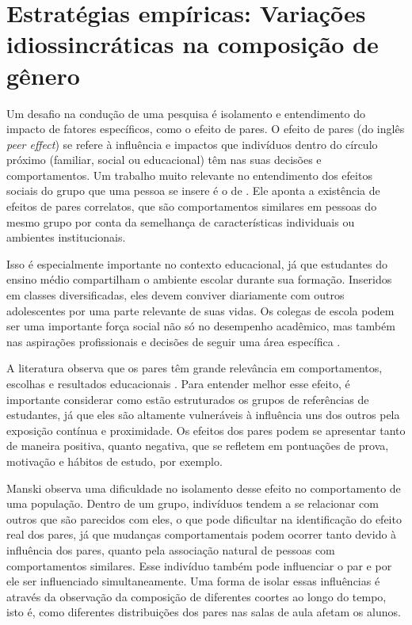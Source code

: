 \section{Estratégias empíricas: Variações idiossincráticas na composição de gênero}
\label{sec:variacoes}
Um desafio na condução de uma pesquisa é isolamento e entendimento do impacto de fatores específicos, como o efeito de pares. O efeito de pares (do inglês \textit{peer effect}) se refere à influência e impactos que indivíduos dentro do círculo próximo (familiar, social ou educacional) têm nas suas decisões e comportamentos. Um trabalho muito relevante no entendimento dos efeitos sociais do grupo que uma pessoa se insere é o de \citet{Manski1993}. Ele aponta a existência de efeitos de pares correlatos, que são comportamentos similares em pessoas do mesmo grupo por conta da semelhança de características individuais ou ambientes institucionais.

Isso é especialmente importante no contexto educacional, já que estudantes do ensino médio compartilham o ambiente escolar durante sua formação. Inseridos em classes diversificadas, eles devem conviver diariamente com outros adolescentes por uma parte relevante de suas vidas. Os colegas de escola podem ser uma importante força social não só no desempenho acadêmico, mas também nas aspirações profissionais e decisões de seguir uma área específica \autocite{Tang2008}.  

A literatura observa que os pares têm grande relevância em comportamentos, escolhas e resultados educacionais \autocite{Sacerdote2014, Zimmerman2003}. Para entender melhor esse efeito, é importante considerar como estão estruturados os grupos de referências de estudantes, já que eles são altamente vulneráveis à influência uns dos outros pela exposição contínua e proximidade. Os efeitos dos pares podem se apresentar tanto de maneira positiva, quanto negativa, que se refletem em pontuações de prova, motivação e hábitos de estudo, por exemplo. 

Manski observa uma dificuldade no isolamento desse efeito no comportamento de uma população. Dentro de um grupo, indivíduos tendem a se relacionar com outros que são parecidos com eles, o que pode dificultar na identificação do efeito real dos pares, já que mudanças comportamentais podem ocorrer tanto devido à influência dos pares, quanto pela associação natural de pessoas com comportamentos similares. Esse indivíduo também pode influenciar o par e por ele ser influenciado simultaneamente. Uma forma de isolar essas influências é através da observação da composição de diferentes coortes ao longo do tempo, isto é, como diferentes distribuições dos pares nas salas de aula afetam os alunos.

